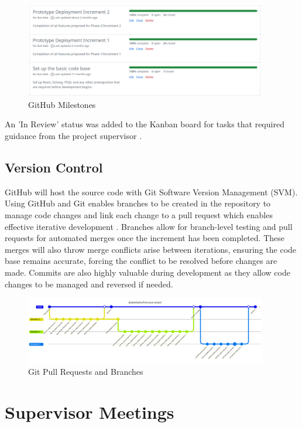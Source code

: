 \begin{figure}
    \centering
    \includegraphics[width=400px]{figures/milestones.png}
    \caption{GitHub Milestones}
    \label{fig:milestones}
\end{figure}

An 'In Review' status was added to the Kanban board for tasks that required guidance from the project supervisor .

\subsection{Version Control}
\label{pm:version_control}

GitHub will host the source code with Git Software Version Management (SVM). Using GitHub and Git enables branches to be created in the repository to manage code changes and link each change to a pull request which enables effective iterative development . Branches allow for branch-level testing and pull requests for automated merges once the increment has been completed. These merges will also throw merge conflicts arise between iterations, ensuring the code base remains accurate, forcing the conflict to be resolved before changes are made. Commits are also highly valuable during development as they allow code changes to be managed and reversed if needed. 

\begin{figure}[!ht]
    \centering
    \includegraphics[width=400px]{figures/gitgraph.pdf}
    \caption{Git Pull Requests and Branches}
    \label{fig:gitgraph}
\end{figure}

\section{Supervisor Meetings}
\label{pm:supervisor_meetings}

